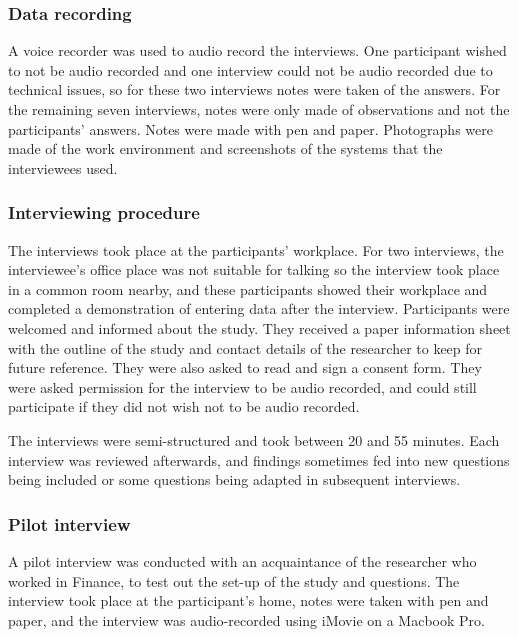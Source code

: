 \subsubsection{Data recording}
A voice recorder was used to audio record the interviews. One participant wished to not be audio recorded and one interview could not be audio recorded due to technical issues, so for these two interviews notes were taken of the answers. For the remaining seven interviews, notes were only made of observations and not the participants' answers. Notes were made with pen and paper. Photographs were made of the work environment and screenshots of the systems that the interviewees used.

\subsubsection{Interviewing procedure}
The interviews took place at the participants' workplace. For two interviews, the interviewee's office place was not suitable for talking so the interview took place in a common room nearby, and these participants showed their workplace and completed a demonstration of entering data after the interview. Participants were welcomed and informed about the study. They received a paper information sheet with the outline of the study and contact details of the researcher to keep for future reference. They were also asked to read and sign a consent form. They were asked permission for the interview to be audio recorded, and could still participate if they did not wish not to be audio recorded. 


The interviews were semi-structured and took between 20 and 55 minutes. Each interview was reviewed afterwards, and findings sometimes fed into new questions being included or some questions being adapted in subsequent interviews.

\subsubsection{Pilot interview}
A pilot interview was conducted with an acquaintance of the researcher who worked in Finance, to test out the set-up of the study and questions. The interview took place at the participant's home, notes were taken with pen and paper, and the interview was audio-recorded using iMovie on a Macbook Pro. 

